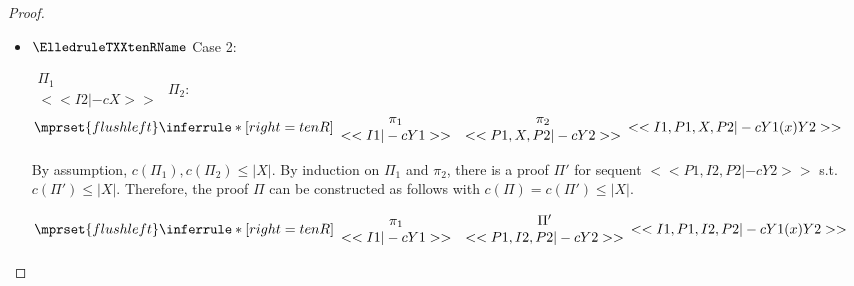 \begin{proof}
\begin{enumerate}
\begin{itemize}
  \item $\ElledruleTXXtenRName$ Case 2:
      \begin{center}
        \scriptsize
        \begin{math}
          \begin{array}{c}
            \Pi_1 \\
            {<<I2 |-c X>>}
          \end{array}
        \end{math}
        \qquad\qquad
        $\Pi_2$:
        \begin{math}
          $$\mprset{flushleft}
          \inferrule* [right={\tiny tenR}] {
            {
              \begin{array}{cc}
                \pi_1 & \pi_2 \\
                {<<I1 |-c Y1>>} & {<<P1, X, P2 |-c Y2>>}
              \end{array}
            }
          }{<<I1, P1, X, P2 |-c Y1 (x) Y2>>}
        \end{math}
      \end{center}
      By assumption, $c(\Pi_1),c(\Pi_2)\leq |X|$. By induction on $\Pi_1$ and $\pi_2$, there
      is a proof $\Pi'$ for sequent $<<P1, I2, P2 |-c Y2>>$ s.t. $c(\Pi') \leq |X|$.
      Therefore, the proof $\Pi$ can be constructed as follows with
      $c(\Pi) = c(\Pi') \leq |X|$.
      \begin{center}
        \scriptsize
        \begin{math}
          $$\mprset{flushleft}
          \inferrule* [right={\tiny tenR}] {
            {
              \begin{array}{cc}
                \pi_1 & \Pi' \\
                {<<I1 |-c Y1>>} & {<<P1, I2, P2 |-c Y2>>}
              \end{array}
            }
          }{<<I1, P1, I2, P2 |-c Y1 (x) Y2>>}
        \end{math}
      \end{center}


\end{itemize}
\end{enumerate}
\end{proof}
